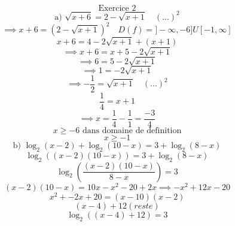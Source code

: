 \documentclass{article}
\begin{document}
\[ \text{Exercice 2} \]
\[ \text{a) } \sqrt{x+6} = 2 - \sqrt{x+1} \quad (...)^2 \]
\[ \implies x+6 = (2 - \sqrt{x+1})^2 \quad D(f) = ]-\infty,-6]U[-1,\infty]\]
\[ x+6 = 4 - 2\sqrt{x+1} + (x+1) \]
\[ \implies x+6 = x+5 - 2\sqrt{x+1} \]
\[ \implies 6 = 5 -2\sqrt{x+1} \]
\[ \implies 1 = -2\sqrt{x+1} \]
\[ \implies -\frac{1}{2} = \sqrt{x+1} \quad (...)^2\]
\[ \frac{1}{4} = x+1 \]
\[ \implies x = \frac{1}{4} - \frac{1}{1} = \frac{-3}{4} \]
\[ x \ge -6 \text{ dans domaine de definition} \]
\[ x \ge -1 \]
\[ \text{b) } \log_2(x-2) + \log_2(10-x) = 3 + \log_2(8-x) \]
\[ \log_2((x-2)(10-x)) = 3 + \log_2(8-x) \]
\[ \log_2\left(\frac{(x-2)(10-x)}{8-x}\right) = 3 \]
\[ (x-2)(10-x) = 10x - x^2 - 20 + 2x \implies -x^2 + 12x - 20 \]
\[ x^2+-2x+20 = (x-10)(x-2) \]
\[ (x-4)+12 (reste) \]
\[ \log_2((x-4)+12) = 3 \]
\end{document}
